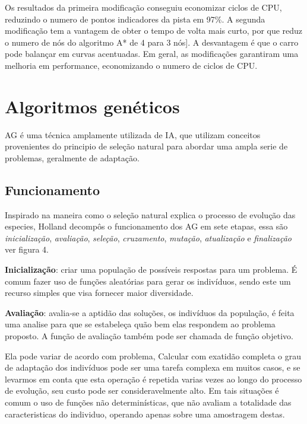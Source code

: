 Os resultados da primeira modificação conseguiu economizar ciclos de CPU, reduzindo o numero de pontos indicadores da pista em 97\%. A segunda modificação tem a vantagem de obter o tempo de volta mais curto, por que reduz o numero de nós do algoritmo A* de 4 para 3 nós]. A desvantagem é que o carro pode balançar em curvas acentuadas. Em geral, as modificações garantiram uma melhoria em performance, economizando o numero de ciclos de CPU.

\section{Algoritmos genéticos}

AG é uma técnica amplamente utilizada de IA, que utilizam conceitos provenientes do principio de seleção natural para abordar uma  ampla serie de problemas, geralmente de adaptação.

\subsection{Funcionamento}
 
Inspirado na maneira como o seleção natural explica o processo de evolução das especies, Holland \cite{Holland1975} decompôs o funcionamento dos AG em sete etapas, essa são \textit{inicialização}, \textit{avaliação}, \textit{seleção}, \textit{cruzamento}, \textit{mutação}, \textit{atualização} e  \textit{finalização} ver figura 4. \cite{DiogoCLucas}


\textbf{Inicialização}: criar uma população de possíveis respostas para um problema. 
É comum fazer uso de funções aleatórias para gerar os indivíduos, sendo este um recurso simples que visa fornecer maior diversidade.

\textbf{Avaliação}: avalia-se a aptidão das soluções, os indivíduos da população, é feita uma analise para que se estabeleça quão bem elas respondem ao problema proposto.
A função de avaliação também pode ser chamada de função objetivo. 

Ela pode variar de acordo com problema,  
Calcular com exatidão completa o grau de adaptação dos indivíduos pode ser uma tarefa complexa em muitos casos, e se levarmos em conta que esta operação é repetida varias vezes ao longo do processo de evolução, seu custo pode ser consideravelmente alto. Em tais situações é comum o uso de funções não determinísticas, que não avaliam a totalidade das caracteristicas do individuo, operando apenas sobre uma amostragem destas.

